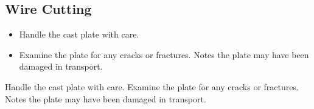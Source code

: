 \subsection{Wire Cutting}
\begin{itemize}
\item Handle the cast plate with care. 
\item Examine the plate for any cracks or fractures. Notes the plate may have been damaged in transport. 
\end{itemize}

Handle the cast plate with care. 
Examine the plate for any cracks or fractures. Notes the plate may have been damaged in transport. 